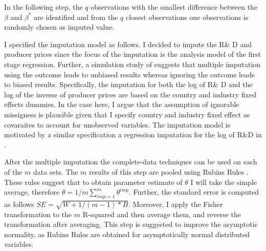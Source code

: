 In the following step, the $q$  observations with the smallest difference between the $\beta$ and $\beta^*$ are identified and from the $q$ closest observations one observations is randomly chosen as imputed value.
  \par
  I specified the imputation model as follows.
  I decided to impute the R\& D and producer prices since the focus of the imputation is the analysis model of the first stage regression.
  Further, a simulation study of \textcite{Moons:2006a} suggests that multiple imputation using the outcome leads to unbiased results whereas ignoring the outcome leads to biased results.
Specifically, the imputation for both the log of R\& D and the log of the inverse of producer prices are based on the country and industry fixed effects dummies.
  In the case here, I argue that the assumption of ignorable missigness is plausible  given that I specify  country and industry fixed effect as covaraites to account for unobserved variables.
  The imputation model is motivated by a similar specification a regression imputation for the log of R\&D in \textcite{costinot}.
  \par
  After the multiple imputation the complete-data techniques can be used on each of the $m$ data sets.
The $m$ results of this step are pooled using Rubins Rules \textcite[p.77]{Rubin1987}.
 These rules suggest that to obtain parameter estimate of $\theta$ I will take the simple average,
therefore $\theta=1/m  \sum_{imp=1} ^m \theta^{imp}$.
Further, the standard error is computed as follows $SE=\sqrt{W+ 1/(m-1)*B}$.
Moreover, I apply the Fisher transformation to the $m$ R-squared and then average them, and reverse the transformation after averaging.
This step is suggested to improve the asymptotic normality, as Rubins Rules are obtained for asymptotically normal distributed variables.
\par
